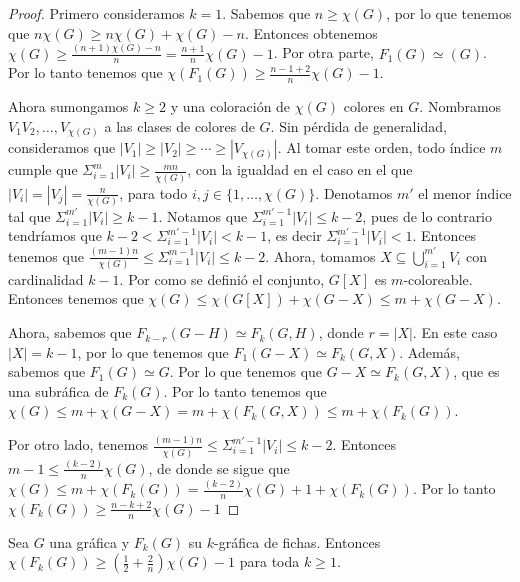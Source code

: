         
        \begin{proof}
        Primero consideramos $k=1$. Sabemos que $n \geq \chi(G)$, por lo que
        tenemos que $n\chi(G) \geq n\chi(G) + \chi(G) -n$. Entonces obtenemos
        $\chi (G) \geq \frac{(n+1)\chi(G)-n}{n} = \frac{n+1}{n}\chi (G) -1$.
        Por otra parte, $F_1(G) \simeq (G)$. Por lo tanto tenemos que
        $\chi(F_1(G)) \geq \frac{n-1+2}{n} \chi(G) -1$.
        
            Ahora sumongamos $k \geq 2$ y una coloraci\'on de $\chi(G)$ colores
            en $G$. Nombramos $V_1 V_2, \dots, V_{\chi(G)}$ a las clases de
            colores de $G$. Sin p\'erdida de generalidad, consideramos que
            $|V_1|\geq |V_2|\geq \cdots \geq |V_{\chi(G)}|$. Al tomar este
            orden, todo \'indice $m$ cumple que $\Sigma_{i=1}^{m}|V_i| \geq
            \frac{mn}{\chi(G)}$, con la igualdad en el caso en el que $|V_i| =
            |V_j| = \frac{n}{\chi(G)}$, para todo $i,j \in \{1, \dots,
            \chi(G)\}$.
            Denotamos $m'$ el menor \'indice tal que $\Sigma_{i=1}^{m'}|V_i|
            \geq k-1$. Notamos que $\Sigma_{i=1}^{m'-1}|V_i| \leq k-2$, pues de
            lo contrario tendr\'iamos que $k-2<\Sigma_{i=1}^{m'-1}|V_i| < k-1$,
            es decir $\Sigma_{i=1}^{m'-1}|V_i|<1$. Entonces tenemos que
            $\frac{(m-1)n}{\chi(G)}\leq \Sigma_{i=1}^{m-1}|V_i| \leq k-2$.
            Ahora, tomamos $X \subseteq \bigcup_{i=1}^{m'} V_i$ con cardinalidad
            $k-1$. Por como se defini\'o el conjunto, $G[X]$ es $m$-coloreable.
            Entonces tenemos que  $\chi(G) \leq \chi(G[X])+\chi(G-X) \leq m +
            \chi(G-X)$.
        
            Ahora, sabemos que $F_{k-r}(G-H) \simeq F_k(G,H)$, donde $r =
            |X|$. En este caso $|X| = k-1$, por lo que tenemos que $F_1(G-X)
            \simeq F_k(G,X)$. Adem\'as, sabemos que $F_1(G) \simeq G$. Por lo
            que tenemos que $G-X \simeq F_k(G,X)$, que es una subr\'afica de
            $F_k(G)$. Por lo tanto tenemos que $\chi(G) \leq m + \chi(G-X) = m
            + \chi(F_k(G,X)) \leq m + \chi(F_k(G))$. 
            
            Por otro lado, tenemos $\frac{(m-1)n}{\chi(G)}\leq
            \Sigma_{i=1}^{m'-1}|V_i| \leq k-2$. Entonces $m-1 \leq
            \frac{(k-2)}{n}\chi(G)$, de donde se sigue que $\chi(G) \leq m +
            \chi(F_k(G)) = \frac{(k-2)}{n}\chi(G) +1 + \chi(F_k(G))$. Por lo
            tanto $\chi(F_k(G)) \geq \frac{n-k+2}{n} \chi(G) -1$
        \end{proof}
    \begin{teorema}
    \label{relacion num cromatico indep k}
        Sea $G$ una gr\'afica y $F_k(G)$ su $k$-gr\'afica de fichas. Entonces $\chi
        (F_k(G)) \geq (\frac{1}{2}+ \frac{2}{n})\chi(G) -1 $ para toda $k \geq 1$.
    \end{teorema}
    
